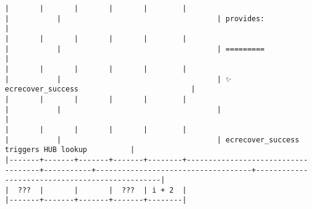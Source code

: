 \documentclass[varwidth=\maxdimen,margin=0.5cm,multi={verbatim}]{standalone}
\begin{document}
\begin{verbatim}
|       |       |       |       |        |                                    |           |                                    | provides:                                      |
|       |       |       |       |        |                                    |           |                                    | =========                                      |
|       |       |       |       |        |                                    |           |                                    | ✨  ecrecover_success                          |
|       |       |       |       |        |                                    |           |                                    |                                                |
|       |       |       |       |        |                                    |           |                                    | ecrecover_success triggers HUB lookup          |
|-------+-------+-------+-------+--------+------------------------------------+-----------+------------------------------------+------------------------------------------------|
|  ???  |       |       |  ???  | i + 2  |
|-------+-------+-------+-------+--------|

\end{verbatim}
\end{document}
